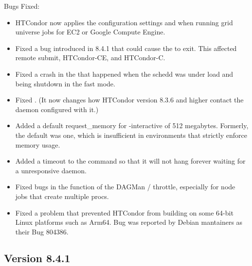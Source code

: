 \noindent Bugs Fixed:

\begin{itemize}

\item HTCondor now applies the configuration settings
 and
when running grid universe jobs for EC2 or Google Compute Engine.

\item Fixed a bug introduced in 8.4.1 that could cause the  to exit.
This affected remote submit, HTCondor-CE, and HTCondor-C.

\item Fixed a crash in the  that happened when the
schedd was under load and being shutdown in the fast mode.

\item Fixed .  (It now changes how HTCondor
version 8.3.6 and higher contact the daemon configured with it.)

\item Added a default request\_memory for  -interactive
of 512 megabytes.  Formerly, the default was one, which is
insufficient in environments that strictly enforce memory
usage.

\item Added a timeout to the  command so that it
will not hang forever waiting for a unresponsive daemon.

\item Fixed bugs in the function of the DAGMan
/ throttle,
especially for node jobs that create multiple procs.

\item Fixed a problem that prevented HTCondor from building on some 64-bit Linux
platforms such as Arm64.  Bug was reported by Debian mantainers as their Bug 804386.

\end{itemize}

\subsection*{\label{sec:New-8-4-1}Version 8.4.1}

